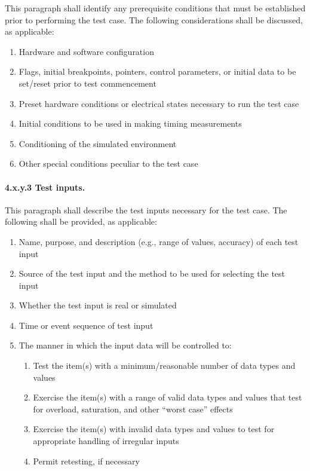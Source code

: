 This paragraph shall identify any prerequisite conditions that must be
established prior to performing the test case. The following
considerations shall be discussed, as applicable:

\begin{enumerate}
\itemsep1pt\parskip0pt
\item
  Hardware and software configuration
\item
  Flags, initial breakpoints, pointers, control parameters, or initial
  data to be set/reset prior to test commencement
\item
  Preset hardware conditions or electrical states necessary to run the
  test case
\item
  Initial conditions to be used in making timing measurements
\item
  Conditioning of the simulated environment
\item
  Other special conditions peculiar to the test case
\end{enumerate}

\paragraph{4.x.y.3 Test inputs.}

This paragraph shall describe the test inputs necessary for the test
case. The following shall be provided, as applicable:

\begin{enumerate}
\itemsep1pt\parskip0pt
\item
  Name, purpose, and description (e.g., range of values, accuracy) of
  each test input
\item
  Source of the test input and the method to be used for selecting the
  test input
\item
  Whether the test input is real or simulated
\item
  Time or event sequence of test input
\item
  The manner in which the input data will be controlled to:

  \begin{enumerate}
  \itemsep1pt\parskip0pt
  \item
    Test the item(s) with a minimum/reasonable number of data types and
    values
  \item
    Exercise the item(s) with a range of valid data types and values
    that test for overload, saturation, and other ``worst case'' effects
  \item
    Exercise the item(s) with invalid data types and values to test for
    appropriate handling of irregular inputs
  \item
    Permit retesting, if necessary
  \end{enumerate}
\end{enumerate}

